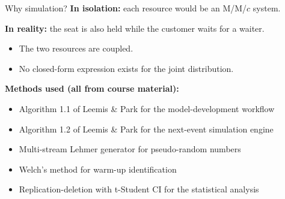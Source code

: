 \documentclass[10pt,aspectratio=169]{beamer}
\begin{document}
\begin{frame}{Why simulation?}
\textbf{In isolation:} each resource would be an M/M/$c$ system.

\vspace{0.3cm}
\textbf{In reality:} the seat is also held \alert{while the customer waits for a waiter}.
\begin{itemize}
  \item The two resources are \alert{coupled}.
  \item No closed-form expression exists for the joint distribution.
\end{itemize}

\vspace{0.5cm}
\textbf{Methods used (all from course material):}
\begin{itemize}
  \item Algorithm 1.1 of Leemis \& Park for the model-development workflow
  \item Algorithm 1.2 of Leemis \& Park for the next-event simulation engine
  \item Multi-stream Lehmer generator for pseudo-random numbers
  \item Welch's method for warm-up identification
  \item Replication-deletion with t-Student CI for the statistical analysis
\end{itemize}
\end{frame}

\end{document}
